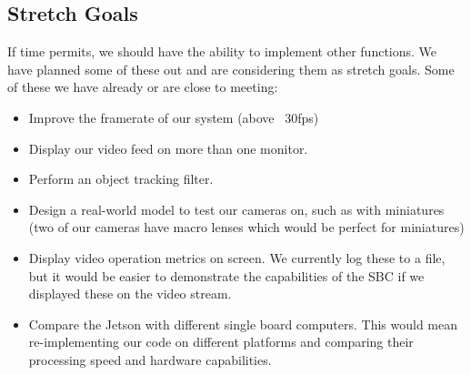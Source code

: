 \documentclass[letterpaper,10pt,titlepage]{IEEEtran}
\begin{document}
	\subsection{Stretch Goals}
	If time permits, we should have the ability to implement other functions. We have planned some of these out and are considering them as stretch goals. Some of these we have already or are close to meeting:\\
	\begin{itemize}
		\item Improve the framerate of our system (above ~30fps)
		\item Display our video feed on more than one monitor.
		\item Perform an object tracking filter.
		\item Design a real-world model to test our cameras on, such as with miniatures (two of our cameras have macro lenses which would be perfect for miniatures)
		\item Display video operation metrics on screen. We currently log these to a file, but it would be easier to demonstrate the capabilities of the SBC if we displayed these on the video stream.
		\item Compare the Jetson with different single board computers. This would mean re-implementing our code on different platforms and comparing their processing speed and hardware capabilities.\\
	\end{itemize}
	
\end{document}
